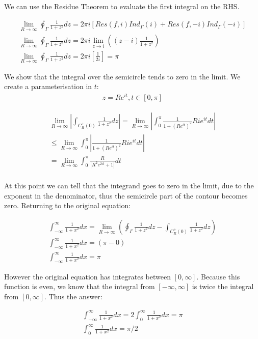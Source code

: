 \documentclass{article}
\begin{document}
			We can use the Residue Theorem to evaluate the first integral on the RHS.
			
			\begin{gather}
				\lim_{R\to\infty}\oint_\Gamma \frac{1}{1+z^2}dz = 2\pi i [Res(f,i)Ind_\Gamma(i)+Res(f,-i)Ind_\Gamma(-i)]\\
				\lim_{R\to\infty}\oint_\Gamma \frac{1}{1+z^2}dz = 2\pi i \lim_{z\to i}\left( (z-i)\frac{1}{1+z^2} \right)\\
				\lim_{R\to\infty}\oint_\Gamma \frac{1}{1+z^2}dz = 2\pi i [\frac{1}{2i}] = \pi
			\end{gather}
					
			We show that the integral over the semicircle tends to zero in the limit. We create a parameterisation in $t$:
			\begin{gather}
				z=Re^{it}, t \in [0,\pi]
			\end{gather}
			
			\begin{gather}
				\lim_{R\to\infty}\left| \int_{ C^{+}_{R}(0)}\frac{1}{1+z^2}dz \right| = \lim_{R\to\infty}\left| \int^{\pi}_{0}\frac{1}{1+(Re^{it})^2}Rie^{it}dt \right|\\
				\leq \lim_{R\to\infty} \int_{0}^{\pi} \left|    \frac{1}{1+(Re^{it})^2}Rie^{it}dt  \right|\\
				= \lim_{R\to\infty} \int_{0}^{\pi} \frac{R}{|R^2e^{2it}+1|}dt  \\
			\end{gather}
			
			At this point we can tell that the integrand goes to zero in the limit, due to the exponent in the denominator, thus the semicircle part of the contour becomes zero. Returning to the original equation:
			
			\begin{gather}
				\int_{-\infty}^{\infty}\frac{1}{1+x^2}dx = \lim_{R\to\infty} \left( \oint_{\Gamma}\frac{1}{1+z^2}dz - \int_{ C^{+}_{R}(0)}\frac{1}{1+z^2}dz\right)\\
				\int_{-\infty}^{\infty}\frac{1}{1+x^2}dx = \left( \pi - 0\right)\\
				\int_{-\infty}^{\infty}\frac{1}{1+x^2}dx = \pi
			\end{gather}
			
			However the original equation has integrates between $[0,\infty]$. 
			Because this function is even, we know that the integral from $[-\infty,\infty]$ is twice the integral from $[0,\infty]$.
			Thus the answer:
			
			\begin{gather}
				\int_{-\infty}^{\infty}\frac{1}{1+x^2}dx = 2\int_{0}^{\infty}\frac{1}{1+x^2}dx =\pi\\
				\int_{0}^{\infty}\frac{1}{1+x^2}dx =\pi/2
			\end{gather}
			
\end{document}
